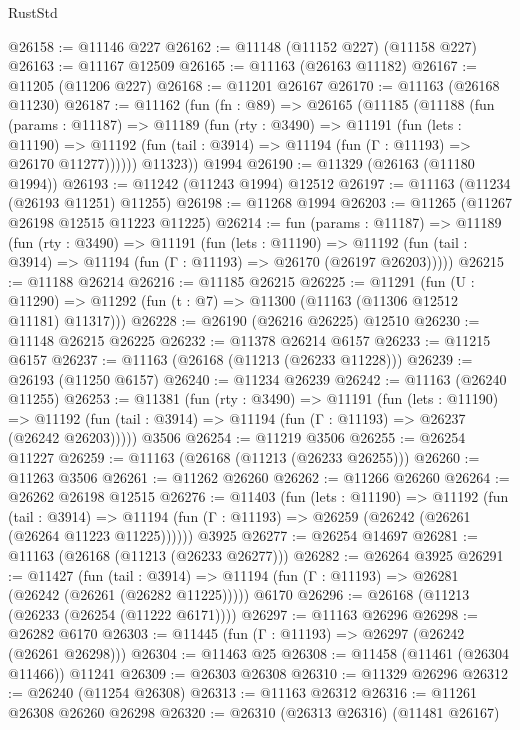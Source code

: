 \begin{lexlean}{RustStd}
\begin{coremodule}
@26158 := @11146 @227
@26162 := @11148 (@11152 @227) (@11158 @227)
@26163 := @11167 @12509
@26165 := @11163 (@26163 @11182)
@26167 := @11205 (@11206 @227)
@26168 := @11201 @26167
@26170 := @11163 (@26168 @11230)
@26187 := @11162
    (fun (fn : @89) =>
    @26165
      (@11185
        (@11188
          (fun (params : @11187) =>
          @11189
            (fun (rty : @3490) =>
            @11191
              (fun (lets : @11190) =>
              @11192 (fun (tail : @3914) => @11194 (fun (Γ : @11193) => @26170 @11277))))))
        @11323))
    @1994
@26190 := @11329 (@26163 (@11180 @1994))
@26193 := @11242 (@11243 @1994) @12512
@26197 := @11163 (@11234 (@26193 @11251) @11255)
@26198 := @11268 @1994
@26203 := @11265 (@11267 @26198 @12515 @11223 @11225)
@26214 := fun (params : @11187) =>
  @11189
    (fun (rty : @3490) =>
    @11191
      (fun (lets : @11190) =>
      @11192 (fun (tail : @3914) => @11194 (fun (Γ : @11193) => @26170 (@26197 @26203)))))
@26215 := @11188 @26214
@26216 := @11185 @26215
@26225 := @11291
    (fun (U : @11290) => @11292 (fun (t : @7) => @11300 (@11163 (@11306 @12512 @11181) @11317)))
@26228 := @26190 (@26216 @26225) @12510
@26230 := @11148 @26215 @26225
@26232 := @11378 @26214 @6157
@26233 := @11215 @6157
@26237 := @11163 (@26168 (@11213 (@26233 @11228)))
@26239 := @26193 (@11250 @6157)
@26240 := @11234 @26239
@26242 := @11163 (@26240 @11255)
@26253 := @11381
    (fun (rty : @3490) =>
    @11191
      (fun (lets : @11190) =>
      @11192 (fun (tail : @3914) => @11194 (fun (Γ : @11193) => @26237 (@26242 @26203)))))
    @3506
@26254 := @11219 @3506
@26255 := @26254 @11227
@26259 := @11163 (@26168 (@11213 (@26233 @26255)))
@26260 := @11263 @3506
@26261 := @11262 @26260
@26262 := @11266 @26260
@26264 := @26262 @26198 @12515
@26276 := @11403
    (fun (lets : @11190) =>
    @11192
      (fun (tail : @3914) =>
      @11194 (fun (Γ : @11193) => @26259 (@26242 (@26261 (@26264 @11223 @11225))))))
    @3925
@26277 := @26254 @14697
@26281 := @11163 (@26168 (@11213 (@26233 @26277)))
@26282 := @26264 @3925
@26291 := @11427
    (fun (tail : @3914) => @11194 (fun (Γ : @11193) => @26281 (@26242 (@26261 (@26282 @11225)))))
    @6170
@26296 := @26168 (@11213 (@26233 (@26254 (@11222 @6171))))
@26297 := @11163 @26296
@26298 := @26282 @6170
@26303 := @11445 (fun (Γ : @11193) => @26297 (@26242 (@26261 @26298)))
@26304 := @11463 @25
@26308 := @11458 (@11461 (@26304 @11466)) @11241
@26309 := @26303 @26308
@26310 := @11329 @26296
@26312 := @26240 (@11254 @26308)
@26313 := @11163 @26312
@26316 := @11261 @26308 @26260 @26298
@26320 := @26310 (@26313 @26316) (@11481 @26167)

\end{coremodule}
\end{lexlean}
